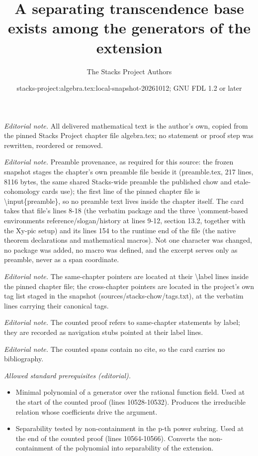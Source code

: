 \documentclass[10pt,a4paper]{amsart}
\title{A separating transcendence base exists among the generators of the extension}
\author{The Stacks Project Authors}
\date{stacks-project:algebra.tex:local-snapshot-20261012; GNU FDL 1.2 or later}
\theoremstyle{plain}
\theoremstyle{definition}
\theoremstyle{remark}
\numberwithin{equation}{subsection}
\begin{document}
\maketitle
\noindent\textit{Editorial note.} All delivered mathematical text is the author's own, copied from the pinned Stacks Project chapter file algebra.tex; no statement or proof step was rewritten, reordered or removed.\par\medskip
\noindent\textit{Editorial note.} Preamble provenance, as required for this source: the frozen snapshot stages the chapter's own preamble file beside it (preamble.tex, 217 lines, 8116 bytes, the same shared Stacks-wide preamble the published chow and etale-cohomology cards use); the first line of the pinned chapter file is \textbackslash{}input\{preamble\}, so no preamble text lives inside the chapter itself. The card takes that file's lines 8-18 (the verbatim package and the three \textbackslash{}comment-based environments reference/slogan/history at lines 9-12, section 13.2, together with the Xy-pic setup) and its lines 154 to the runtime end of the file (the native theorem declarations and mathematical macros). Not one character was changed, no package was added, no macro was defined, and the excerpt serves only as preamble, never as a span coordinate.\par\medskip
\noindent\textit{Editorial note.} The same-chapter pointers are located at their \textbackslash{}label lines inside the pinned chapter file; the cross-chapter pointers are located in the project's own tag list staged in the snapshot (sources/stacks-chow/tags.txt), at the verbatim lines carrying their canonical tags.\par\medskip
\noindent\textit{Editorial note.} The counted proof refers to same-chapter statements by label; they are recorded as navigation stubs pointed at their label lines.\par\medskip
\noindent\textit{Editorial note.} The counted spans contain no cite, so the card carries no bibliography.\par\medskip
\noindent\textit{Allowed standard prerequisites (editorial).}\begin{itemize}
\item Minimal polynomial of a generator over the rational function field. Used at the start of the counted proof (lines 10528-10532). Produces the irreducible relation whose coefficients drive the argument.
\item Separability tested by non-containment in the p-th power subring. Used at the end of the counted proof (lines 10564-10566). Converts the non-containment of the polynomial into separability of the extension.
\end{itemize}\medskip
\end{document}
